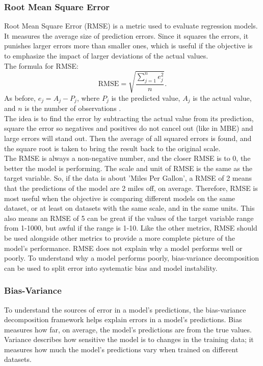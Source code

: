 \newpage

\subsubsection{Root Mean Square Error}   

Root Mean Square Error (RMSE) is a metric used to evaluate regression models. It measures the average size of prediction errors. Since it squares the errors, it punishes larger errors more than smaller ones, which is useful if the objective is to emphasize the impact of larger deviations of the actual values.
\\
The formula for RMSE:
\begin{equation}
	\text{RMSE}=\sqrt{\frac{ \sum_{j=1}^{n} e_j^2 }{n}}.
\end{equation}
As before, $e_{j}=A_{j}-P_{j}$, where $P_{j}$ is the predicted value, $A_{j}$ is the actual value, and $n$ is the number of observations \cite{metrics}.
\\ The idea is to find the error by subtracting the actual value from its prediction, square the error so negatives and positives do not cancel out (like in MBE) and large errors will stand out. Then the average of all squared errors is found, and the square root is taken to bring the result back to the original scale. 
\\

\noindent The RMSE is always a non-negative number, and the closer RMSE is to 0, the better the model is performing. The scale and unit of RMSE is the same as the target variable. So, if the data is about 'Miles Per Gallon', a RMSE of 2 means that the predictions of the model are 2 miles off, on average. Therefore, RMSE is most useful when the objective is comparing different models on the same dataset, or at least on datasets with the same scale, and in the same units. This also means an RMSE of 5 can be great if the values of the target variable range from 1-1000, but awful if the range is 1-10. Like the other metrics, RMSE should be used alongside other metrics to provide a more complete picture of the model’s performance. RMSE does not explain why a model performs well or poorly. To understand why a model performs poorly, bias-variance decomposition can be used to split error into systematic bias and model instability.
\newpage

\subsubsection{Bias-Variance}
To understand the sources of error in a model’s predictions, the bias-variance decomposition framework helps explain errors in a model’s predictions. Bias measures how far, on average, the model's predictions are from the true values. Variance describes how sensitive the model is to changes in the training data; it measures how much the model’s predictions vary when trained on different datasets. 

